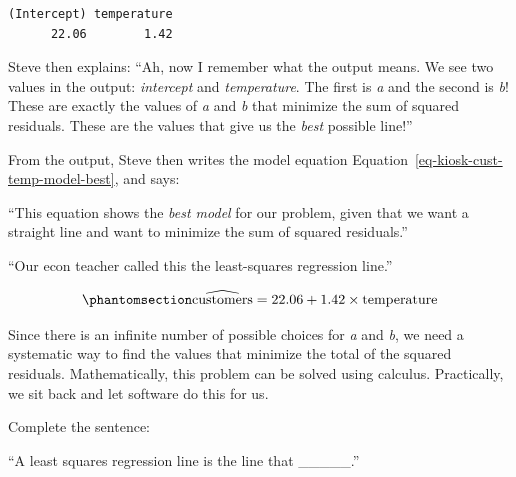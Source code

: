 \documentclass[
  12pt,
  letterpaper,
  DIV=11,
  numbers=noendperiod]{scrreprt}
\begin{document}
\begin{lstlisting}
(Intercept) temperature 
      22.06        1.42 
\end{lstlisting}

Steve then explains: ``Ah, now I remember what the output means. We see
two values in the output: \emph{intercept} and \emph{temperature}. The
first is \emph{a} and the second is \emph{b}! These are exactly the
values of \emph{a} and \emph{b} that minimize the sum of squared
residuals. These are the values that give us the \emph{best} possible
line!''

From the output, Steve then writes the model equation
Equation~\ref{eq-kiosk-cust-temp-model-best}, and says:

``This equation shows the \emph{best model} for our problem, given that
we want a straight line and want to minimize the sum of squared
residuals.''

``Our econ teacher called this the least-squares regression line.''

\begin{equation}\phantomsection\label{eq-kiosk-cust-temp-model-best}{
\widehat{\text{customers}} = 22.06 +  1.42\times\text{temperature}
}\end{equation}

\begin{tcolorbox}[enhanced jigsaw, colback=white, leftrule=.75mm, toprule=.15mm, bottomtitle=1mm, breakable, coltitle=black, toptitle=1mm, title=\textcolor{quarto-callout-note-color}{\faInfo}\hspace{0.5em}{Key Idea}, opacitybacktitle=0.6, colbacktitle=quarto-callout-note-color!10!white, arc=.35mm, left=2mm, colframe=quarto-callout-note-color-frame, titlerule=0mm, rightrule=.15mm, bottomrule=.15mm, opacityback=0]

Since there is an infinite number of possible choices for \emph{a} and
\emph{b}, we need a systematic way to find the values that minimize the
total of the squared residuals. Mathematically, this problem can be
solved using calculus. Practically, we sit back and let software do this
for us.

\end{tcolorbox}

\begin{tcolorbox}[enhanced jigsaw, colback=white, leftrule=.75mm, toprule=.15mm, bottomtitle=1mm, breakable, coltitle=black, toptitle=1mm, title=\textcolor{quarto-callout-note-color}{\faInfo}\hspace{0.5em}{Pause \& Think}, opacitybacktitle=0.6, colbacktitle=quarto-callout-note-color!10!white, arc=.35mm, left=2mm, colframe=quarto-callout-note-color-frame, titlerule=0mm, rightrule=.15mm, bottomrule=.15mm, opacityback=0]

Complete the sentence:

``A least squares regression line is the line that \_\_\_\_\_.''

\end{tcolorbox}
\end{document}
